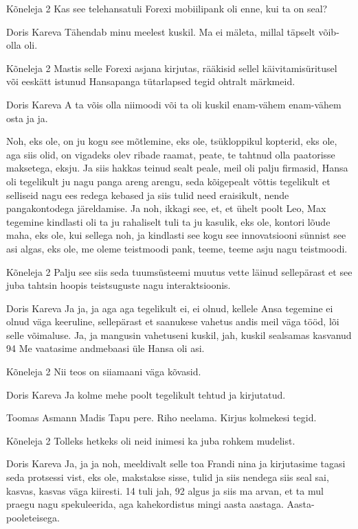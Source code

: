 Kõneleja 2
Kas see telehansatuli Forexi mobiilipank oli enne, kui ta on seal? 

Doris Kareva
Tähendab minu meelest kuskil. Ma ei mäleta, millal täpselt võib-olla oli. 

Kõneleja 2
Mastis selle Forexi asjana kirjutas, rääkisid sellel käivitamisüritusel või eeskätt istunud Hansapanga tütarlapsed tegid ohtralt märkmeid. 

Doris Kareva
A ta võis olla niimoodi või ta oli kuskil enam-vähem enam-vähem osta ja ja. 

Noh, eks ole, on ju kogu see mõtlemine, eks ole, tsükloppikul kopterid, eks ole, aga siis olid, on vigadeks olev ribade raamat, peate, te tahtnud olla paatorisse maksetega, eksju. Ja siis hakkas teinud sealt peale, meil oli palju firmasid, Hansa oli tegelikult ju nagu panga areng arengu, seda kõigepealt võttis tegelikult et selliseid nagu ees redega kebased ja siis tulid need eraisikult, nende pangakontodega järeldamise. Ja noh, ikkagi see, et, et ühelt poolt Leo, Max tegemine kindlasti oli ta ju rahaliselt tuli ta ju kasulik, eks ole, kontori lõude maha, eks ole, kui sellega noh, ja kindlasti see kogu see innovatsiooni sünnist see asi algas, eks ole, me oleme teistmoodi pank, teeme, teeme asju nagu teistmoodi. 

Kõneleja 2
Palju see siis seda tuumsüsteemi muutus vette läinud sellepärast et see juba tahtsin hoopis teistsuguste nagu interaktsioonis. 

Doris Kareva
Ja ja, ja aga aga tegelikult ei, ei olnud, kellele Ansa tegemine ei olnud väga keeruline, sellepärast et saanukese vahetus andis meil väga tööd, lõi selle võimaluse. Ja, ja mangusin vahetuseni kuskil, jah, kuskil sealsamas kasvanud 94 Me vaatasime andmebaasi üle Hansa oli asi. 

Kõneleja 2
Nii teos on siiamaani väga kõvasid. 

Doris Kareva
Ja kolme mehe poolt tegelikult tehtud ja kirjutatud. 

Toomas Asmann Madis Tapu pere. Riho neelama. Kirjus kolmekesi tegid. 

Kõneleja 2
Tolleks hetkeks oli neid inimesi ka juba rohkem mudelist. 

Doris Kareva
Ja, ja ja noh, meeldivalt selle toa Frandi nina ja kirjutasime tagasi seda protsessi vist, eks ole, makstakse sisse, tulid ja siis nendega siis seal sai, kasvas, kasvas väga kiiresti. 14 tuli jah, 92 algus ja siis ma arvan, et ta mul praegu nagu spekuleerida, aga kahekordistus mingi aasta aastaga. Aasta-pooleteisega. 

